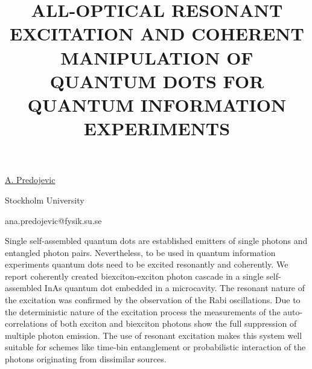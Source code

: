 \title{ALL-OPTICAL RESONANT EXCITATION AND COHERENT MANIPULATION OF QUANTUM DOTS FOR QUANTUM INFORMATION EXPERIMENTS}

\underline{A. Predojevic}  

{\normalsize{\vspace{-4mm}
Stockholm University



\email ana.predojevic@fysik.su.se}}

Single self-assembled quantum dots are established emitters of single photons and entangled photon pairs. Nevertheless, to be used in quantum information experiments quantum dots need to be excited resonantly and coherently. 
We report coherently created biexciton-exciton photon cascade in a single self-assembled InAs quantum dot embedded in a microcavity. The resonant nature of the excitation was confirmed by the observation of the Rabi oscillations. Due to the deterministic nature of the excitation process the measurements of the auto-correlations of both exciton and biexciton photons show the full suppression of multiple photon emission. 
The use of resonant excitation makes this system well suitable for schemes like time-bin entanglement or probabilistic interaction of the photons originating from dissimilar sources. 


\vspace{\baselineskip}